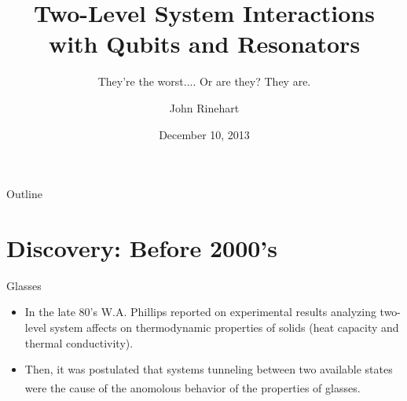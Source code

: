 \documentclass{beamer}
\title[Two-Level System Interactions with Qubits and Resonators] %
{Two-Level System Interactions with Qubits and Resonators}
\subtitle
{They're the worst.... Or are they? They are.} %
\author[] %
{John Rinehart}
\institute[] %
{
  Department of Physics\\
  University of Waterloo
}
\date[] %
{December 10, 2013}
\begin{document}
\begin{frame}
  \titlepage
\end{frame}

\begin{frame}{Outline}
  \tableofcontents
\end{frame}




\section{Discovery: Before 2000's}

\begin{frame}{Glasses}
	\begin{itemize}
	
	\item In the late 80's W.A. Phillips reported on experimental results analyzing two-level system affects on thermodynamic properties of solids (heat capacity and thermal conductivity).
	
	\item Then, it was postulated that systems tunneling between two available states were the cause of the anomolous behavior of the properties of glasses.\textsuperscript{\cite{Phillips}}
	\end{itemize}
\end{frame}
\end{document}
